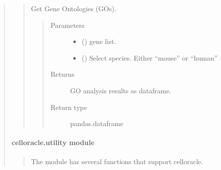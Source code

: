 \documentclass[letterpaper,10pt,english]{sphinxmanual}
\begin{document}
\begin{quote}
\begin{quote}
\begin{fulllineitems}
\label{\detokenize{modules/celloracle.go_analysis:celloracle.go_analysis.get_GO}}
Get Gene Ontologies (GOs).
\begin{quote}\begin{description}
\item[{Parameters}] \leavevmode\begin{itemize}
\item {} 
 () \textendash{} gene list.

\item {} 
 () \textendash{} Select species. Either “mouse” or “human”

\end{itemize}

\item[{Returns}] \leavevmode
GO analysis results as dataframe.

\item[{Return type}] \leavevmode
pandas.dataframe

\end{description}\end{quote}

\end{fulllineitems}

\end{quote}


\paragraph{celloracle.utility module}
\label{\detokenize{modules/celloracle.utility:celloracle-utility-module}}\label{\detokenize{modules/celloracle.utility::doc}}\begin{quote}
\label{\detokenize{modules/celloracle.utility:module-celloracle.utility}}
The {\hyperref[\detokenize{modules/celloracle.utility:module-celloracle.utility}]{}} module has several functions that support celloracle.


\end{quote}
\end{quote}
\end{document}
